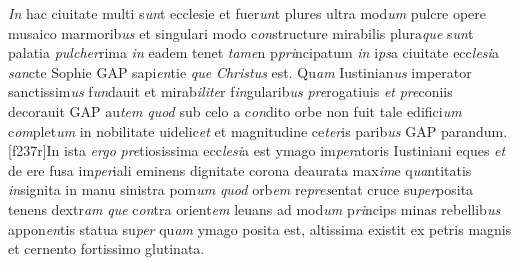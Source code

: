 \documentclass[12pt, a4paper]{book}
\newcommand{\styleabbr}[1]{\textit{#1}}
\begin{document}
				\styleabbr{In} hac ciuitate multi s\styleabbr{un}t ecclesie et fuer\styleabbr{un}t plures ultra
				mod\styleabbr{um} pulcre opere musaico marmorib\styleabbr{us} et singulari modo c\styleabbr{on}structure mirabilis
				plura\styleabbr{que} s\styleabbr{un}t palatia \styleabbr{pulc}\styleabbr{her}rima \styleabbr{in} eadem tenet \styleabbr{tame}n p\styleabbr{pri}ncipatum
				\styleabbr{in} i\styleabbr{ps}a ciuitate ecc\styleabbr{lesi}a \styleabbr{san}cte Sophie GAP sapi\styleabbr{en}tie \styleabbr{que} \styleabbr{Christus} est. Qu\styleabbr{am} Iustinian\styleabbr{us} imperator
				sanctissim\styleabbr{us} f\styleabbr{un}dauit et mirab\styleabbr{ilite}r f\styleabbr{in}gularib\styleabbr{us} \styleabbr{pre}rogatiuis \styleabbr{et} \styleabbr{pre}coniis
				decorauit GAP au\styleabbr{tem} \styleabbr{quod} sub celo a c\styleabbr{on}dito orbe non fuit tale edifici\styleabbr{um}
				c\styleabbr{om}plet\styleabbr{um} in nobilitate uidelic\styleabbr{et} et magnitudine ce\styleabbr{ter}is parib\styleabbr{us} GAP parandum.
				[f237r]In ista \styleabbr{ergo} \styleabbr{pre}tiosissima ecc\styleabbr{lesi}a est ymago im\styleabbr{per}atoris Iustiniani eques \styleabbr{et} de ere fusa
				im\styleabbr{per}iali eminens dignitate corona deaurata max\styleabbr{im}e q\styleabbr{ua}ntitatis \styleabbr{in}signita in
				manu sinistra pom\styleabbr{um} \styleabbr{quod} orb\styleabbr{em} re\styleabbr{pres}entat cruce su\styleabbr{per}posita tenens dextr\styleabbr{am} \styleabbr{que} c\styleabbr{on}tra
				orient\styleabbr{em} leuans ad mod\styleabbr{um} p\styleabbr{ri}ncips minas rebellib\styleabbr{us} appon\styleabbr{en}tis statua su\styleabbr{per} qu\styleabbr{am}
				ymago posita est, altissima existit ex petris magnis et cernento fortissimo
				glutinata.
				
	\pend
	
				
			
		
		
	

			\endnumbering
		
\end{document}
